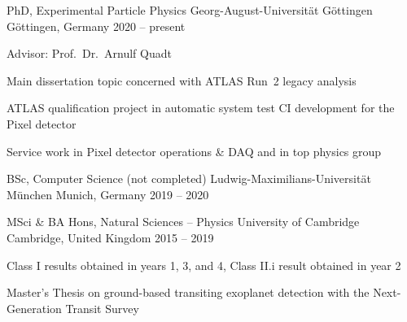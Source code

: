 

\begin{cventries}

  \cventry
    {PhD, Experimental Particle Physics} %
    {Georg-August-Universit\"at G\"ottingen} %
    {G\"ottingen, Germany} %
    {2020 -- present} %
    {%
      \begin{cvitems} %
        \item {Advisor: Prof.\ Dr.\ Arnulf Quadt}
        \item {Main dissertation topic concerned with ATLAS Run~2 \ttHbb legacy analysis}
        \item {ATLAS qualification project in automatic system test CI development for the Pixel detector}
        \item {Service work in Pixel detector operations \& DAQ and in top physics group}
      \end{cvitems}
    }

  \cventry
    {BSc, Computer Science (not completed)} %
    {Ludwig-Maximilians-Universit\"at M\"unchen} %
    {Munich, Germany} %
    {2019 -- 2020} %
    {%
    }

  \cventry
    {MSci \& BA Hons, Natural Sciences -- Physics} %
    {University of Cambridge} %
    {Cambridge, United Kingdom} %
    {2015 -- 2019} %
    {%
      \begin{cvitems} %
        \item {Class I results obtained in years 1, 3, and 4, Class II.i result obtained in year 2}
        \item {
          Master's Thesis on ground-based transiting exoplanet detection with the Next-Generation Transit Survey
        }
      \end{cvitems}
    }

\end{cventries}
